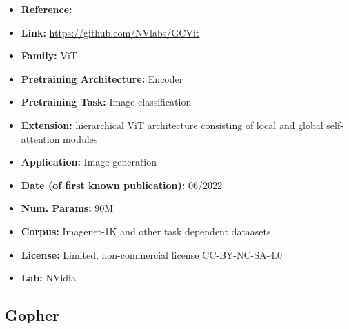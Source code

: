 \documentclass{article}
\begin{document}
            \begin{itemize}
                \item \textbf{Reference:} \href{https://arxiv.org/abs/2206.09959}{}
                \item \textbf{Link:} \url{https://github.com/NVlabs/GCVit}
                \item \textbf{Family:} ViT 
                \item \textbf{Pretraining Architecture:} Encoder
                \item \textbf{Pretraining Task:} Image classification
                \item \textbf{Extension:} hierarchical ViT architecture consisting of local and global self-attention modules  
                \item \textbf{Application:} Image generation
                \item \textbf{Date (of first known publication):} 06/2022
                \item \textbf{Num. Params:} 90M
                \item \textbf{Corpus:} Imagenet-1K and other task dependent dataasets
                \item \textbf{License:} Limited, non-commercial license CC-BY-NC-SA-4.0
                \item \textbf{Lab:} NVidia
            \end{itemize}

\subsection{Gopher}
\end{document}
